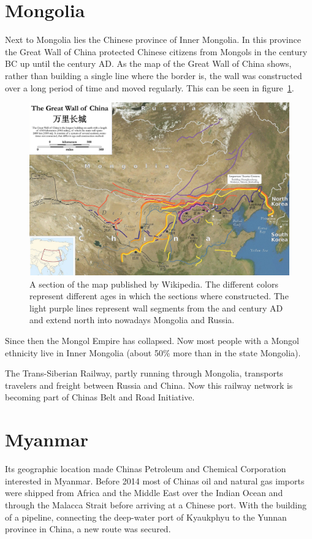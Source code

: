 \documentclass[conference]{IEEEtran}
\begin{document}
	\section{Mongolia}
	Next to Mongolia lies the Chinese province of Inner Mongolia. In this province the Great Wall of China protected Chinese citizens from Mongols in the  century BC up until the  century AD\cite{worldAtlas_whyWasTheGreatWallOfChinaBuilt}. As the map of the Great Wall of China shows, rather than building a single line where the border is, the wall was constructed over a long period of time and moved regularly. This can be seen in figure~\ref{pic:mongolia_greatWallOfChina}.
	
	\begin{figure}[t]
		\centering
		\includegraphics[width=\linewidth]{img/mongolia_greatWallOfChina.png}
		\caption{A section of the map published by Wikipedia\cite{wp_greatWallOfChina}. The different colors represent different ages in which the sections where constructed. The light purple lines represent wall segments from the  and  century AD and extend north into nowadays Mongolia and Russia.}
		\label{pic:mongolia_greatWallOfChina}
	\end{figure}

	Since then the Mongol Empire has collapsed. Now most people with a Mongol ethnicity live in Inner Mongolia (about 50\% more than in the state Mongolia).
	
	The Trans-Siberian Railway, partly running through Mongolia, transports travelers and freight between Russia and China. Now this railway network is becoming part of Chinas Belt and Road Initiative.
	
	\section{Myanmar}
	Its geographic location made Chinas Petroleum and Chemical Corporation interested in Myanmar. Before 2014 most of Chinas oil and natural gas imports were shipped from Africa and the Middle East over the Indian Ocean and through the Malacca Strait before arriving at a Chinese port. With the building of a pipeline, connecting the deep-water port of Kyaukphyu to the Yunnan province in China, a new route was secured\cite{chinaDaily_oilStartsFlowingThroughChinaMyanmarPipeline}.
	
\end{document}
